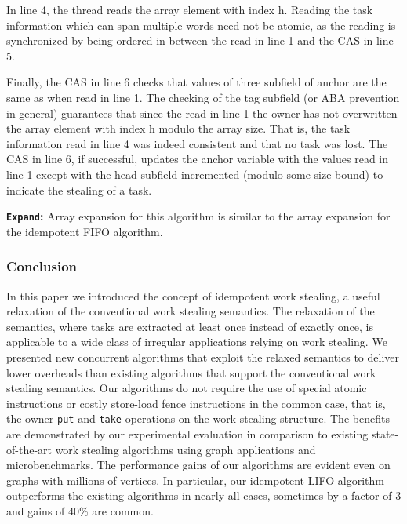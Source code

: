 In line 4, the thread reads the array element with index h. Reading
the task information which can span multiple words need not be atomic,
as the reading is synchronized by being ordered in between the read in
line 1 and the CAS in line 5.

Finally, the CAS in line 6 checks that values of three subfield of
anchor are the same as when read in line 1. The checking of the tag
subfield (or ABA prevention in general) guarantees that since the read
in line 1 the owner has not overwritten the array element with index h
modulo the array size. That is, the task information read in line 4
was indeed consistent and that no task was lost. The CAS in line 6, if
successful, updates the anchor variable with the values read in line 1
except with the head subfield incremented (modulo some size bound) to
indicate the stealing of a task.

\textbf{\lstinline!Expand!:} Array expansion for this algorithm is
similar to the array expansion for the idempotent FIFO algorithm.

\subsubsection{Conclusion}

In this paper we introduced the concept of idempotent work stealing, a
useful relaxation of the conventional work stealing semantics. The
relaxation of the semantics, where tasks are extracted at least once
instead of exactly once, is applicable to a wide class of irregular
applications relying on work stealing. We presented new concurrent
algorithms that exploit the relaxed semantics to deliver lower
overheads than existing algorithms that support the conventional work
stealing semantics. Our algorithms do not require the use of special
atomic instructions or costly store-load fence instructions in the
common case, that is, the owner \lstinline!put! and \lstinline!take!
operations on the work stealing structure. The benefits are
demonstrated by our experimental evaluation in comparison to existing
state-of-the-art work stealing algorithms using graph applications and
microbenchmarks. The performance gains of our algorithms are evident
even on graphs with millions of vertices. In particular, our
idempotent LIFO algorithm outperforms the existing algorithms in
nearly all cases, sometimes by a factor of 3 and gains of 40\% are
common.



